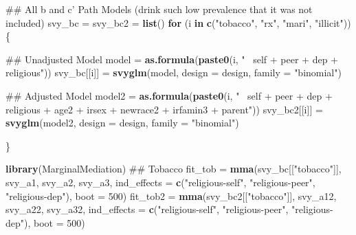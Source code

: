 \documentclass[]{DissertateUSU}
\newenvironment{Shaded}{\begin{snugshade}}{\end{snugshade}}
\newcommand{\KeywordTok}[1]{\textcolor[rgb]{0.13,0.29,0.53}{\textbf{#1}}}
\newcommand{\DataTypeTok}[1]{\textcolor[rgb]{0.13,0.29,0.53}{#1}}
\newcommand{\DecValTok}[1]{\textcolor[rgb]{0.00,0.00,0.81}{#1}}
\newcommand{\StringTok}[1]{\textcolor[rgb]{0.31,0.60,0.02}{#1}}
\newcommand{\ControlFlowTok}[1]{\textcolor[rgb]{0.13,0.29,0.53}{\textbf{#1}}}
\newcommand{\NormalTok}[1]{#1}
\begin{document}
\begin{Shaded}
\begin{Highlighting}[]
\NormalTok{## All b and c' Path Models (drink such low prevalence that it was not included)}
\NormalTok{svy_bc =}\StringTok{ }\NormalTok{svy_bc2 =}\StringTok{ }\KeywordTok{list}\NormalTok{()}
\ControlFlowTok{for}\NormalTok{ (i }\ControlFlowTok{in} \KeywordTok{c}\NormalTok{(}\StringTok{"tobacco"}\NormalTok{, }\StringTok{"rx"}\NormalTok{, }\StringTok{"mari"}\NormalTok{, }\StringTok{"illicit"}\NormalTok{))\{}
  
\NormalTok{  ## Unadjusted Model}
\NormalTok{  model =}\StringTok{ }\KeywordTok{as.formula}\NormalTok{(}\KeywordTok{paste0}\NormalTok{(i, }\StringTok{"~ self + peer + dep + religious"}\NormalTok{))}
\NormalTok{  svy_bc[[i]] =}\StringTok{ }\KeywordTok{svyglm}\NormalTok{(model, }\DataTypeTok{design =}\NormalTok{ design, }\DataTypeTok{family =} \StringTok{"binomial"}\NormalTok{)}
  
\NormalTok{  ## Adjusted Model}
\NormalTok{  model2 =}\StringTok{ }\KeywordTok{as.formula}\NormalTok{(}\KeywordTok{paste0}\NormalTok{(i, }\StringTok{"~ self + peer + dep + religious + age2 + }
\StringTok{                             irsex + newrace2 + irfamin3 + parent"}\NormalTok{))}
\NormalTok{  svy_bc2[[i]] =}\StringTok{ }\KeywordTok{svyglm}\NormalTok{(model2, }\DataTypeTok{design =}\NormalTok{ design, }\DataTypeTok{family =} \StringTok{"binomial"}\NormalTok{)}
  
\NormalTok{\}}

\KeywordTok{library}\NormalTok{(MarginalMediation)}
\NormalTok{## Tobacco}
\NormalTok{fit_tob =}\StringTok{ }\KeywordTok{mma}\NormalTok{(svy_bc[[}\StringTok{"tobacco"}\NormalTok{]],}
\NormalTok{              svy_a1,}
\NormalTok{              svy_a2,}
\NormalTok{              svy_a3,}
              \DataTypeTok{ind_effects =} \KeywordTok{c}\NormalTok{(}\StringTok{"religious-self"}\NormalTok{,}
                              \StringTok{"religious-peer"}\NormalTok{,}
                              \StringTok{"religious-dep"}\NormalTok{),}
              \DataTypeTok{boot =} \DecValTok{500}\NormalTok{)}
\NormalTok{fit_tob2 =}\StringTok{ }\KeywordTok{mma}\NormalTok{(svy_bc2[[}\StringTok{"tobacco"}\NormalTok{]],}
\NormalTok{               svy_a12,}
\NormalTok{               svy_a22,}
\NormalTok{               svy_a32,}
               \DataTypeTok{ind_effects =} \KeywordTok{c}\NormalTok{(}\StringTok{"religious-self"}\NormalTok{,}
                               \StringTok{"religious-peer"}\NormalTok{,}
                               \StringTok{"religious-dep"}\NormalTok{),}
               \DataTypeTok{boot =} \DecValTok{500}\NormalTok{)}


\end{Highlighting}
\end{Shaded}
\end{document}
